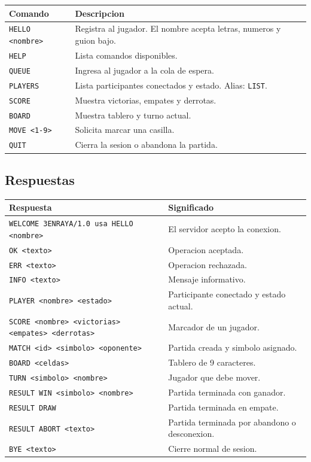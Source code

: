 \documentclass[12pt,a4paper]{article}
\begin{document}
\begin{longtable}{|p{4cm}|p{9cm}|}
\hline
\textbf{Comando} & \textbf{Descripcion} \\
\hline
\texttt{HELLO <nombre>} & Registra al jugador. El nombre acepta letras, numeros y guion bajo. \\
\hline
\texttt{HELP} & Lista comandos disponibles. \\
\hline
\texttt{QUEUE} & Ingresa al jugador a la cola de espera. \\
\hline
\texttt{PLAYERS} & Lista participantes conectados y estado. Alias: \texttt{LIST}. \\
\hline
\texttt{SCORE} & Muestra victorias, empates y derrotas. \\
\hline
\texttt{BOARD} & Muestra tablero y turno actual. \\
\hline
\texttt{MOVE <1-9>} & Solicita marcar una casilla. \\
\hline
\texttt{QUIT} & Cierra la sesion o abandona la partida. \\
\hline
\end{longtable}

\subsection{Respuestas}

\begin{longtable}{|p{5cm}|p{8cm}|}
\hline
\textbf{Respuesta} & \textbf{Significado} \\
\hline
\texttt{WELCOME 3ENRAYA/1.0 usa HELLO <nombre>} & El servidor acepto la conexion. \\
\hline
\texttt{OK <texto>} & Operacion aceptada. \\
\hline
\texttt{ERR <texto>} & Operacion rechazada. \\
\hline
\texttt{INFO <texto>} & Mensaje informativo. \\
\hline
\texttt{PLAYER <nombre> <estado>} & Participante conectado y estado actual. \\
\hline
\texttt{SCORE <nombre> <victorias> <empates> <derrotas>} & Marcador de un jugador. \\
\hline
\texttt{MATCH <id> <simbolo> <oponente>} & Partida creada y simbolo asignado. \\
\hline
\texttt{BOARD <celdas>} & Tablero de 9 caracteres. \\
\hline
\texttt{TURN <simbolo> <nombre>} & Jugador que debe mover. \\
\hline
\texttt{RESULT WIN <simbolo> <nombre>} & Partida terminada con ganador. \\
\hline
\texttt{RESULT DRAW} & Partida terminada en empate. \\
\hline
\texttt{RESULT ABORT <texto>} & Partida terminada por abandono o desconexion. \\
\hline
\texttt{BYE <texto>} & Cierre normal de sesion. \\
\hline
\end{longtable}
\end{document}

